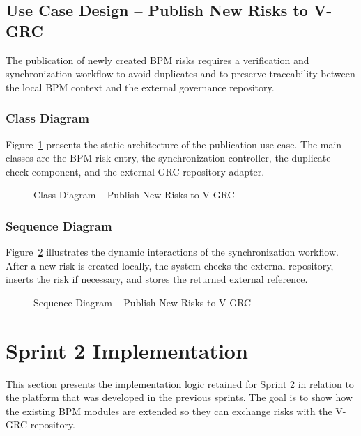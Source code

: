 \subsection{Use Case Design -- Publish New Risks to V-GRC}

The publication of newly created BPM risks requires a verification and synchronization workflow to avoid duplicates and to preserve traceability between the local BPM context and the external governance repository.

\subsubsection{Class Diagram}

Figure~\ref{fig:class-grc-push} presents the static architecture of the publication use case. The main classes are the BPM risk entry, the synchronization controller, the duplicate-check component, and the external GRC repository adapter.

\begin{figure}[H]
\centering
{}
\caption{Class Diagram -- Publish New Risks to V-GRC}
\label{fig:class-grc-push}
\end{figure}

\subsubsection{Sequence Diagram}

Figure~\ref{fig:seq-grc-push} illustrates the dynamic interactions of the synchronization workflow. After a new risk is created locally, the system checks the external repository, inserts the risk if necessary, and stores the returned external reference.

\begin{figure}[H]
\centering
{}
\caption{Sequence Diagram -- Publish New Risks to V-GRC}
\label{fig:seq-grc-push}
\end{figure}

\section{Sprint 2 Implementation}

This section presents the implementation logic retained for Sprint 2 in relation to the platform that was developed in the previous sprints. The goal is to show how the existing BPM modules are extended so they can exchange risks with the V-GRC repository.

